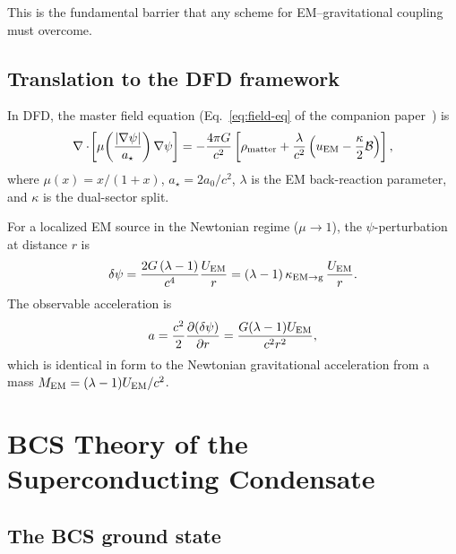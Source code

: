 \documentclass[12pt,aps,prd,twocolumn,superscriptaddress,nofootinbib]{revtex4-2}
\newcommand{\psifield}{\psi}
\newcommand{\astar}{a_\star}
\newcommand{\azero}{a_0}
\newcommand{\mufunction}{\mu}
\newcommand{\lam}{\lambda}
\newcommand{\kap}{\kappa}
\newcommand{\calB}{\mathcal{B}}
\begin{document}
This is the fundamental barrier that any scheme for EM--gravitational
coupling must overcome.

\subsection{Translation to the DFD framework}

In DFD, the master field equation (Eq.~\eqref{eq:field-eq} of the
companion paper~\cite{Alcock2025Deep_EM}) is
\begin{equation}\label{eq:dfd-master}
\nabla\cdot\!\left[\mufunction\!\left(\frac{|\nabla\psifield|}{\astar}\right)
\nabla\psifield\right] =
-\frac{4\pi G}{c^2}\left[
  \rho_{\rm matter}
  + \frac{\lam}{c^2}\left(u_{\rm EM} - \frac{\kap}{2}\calB\right)
\right],
\end{equation}
where $\mu(x) = x/(1+x)$, $\astar = 2\azero/c^2$, $\lam$ is the
EM back-reaction parameter, and $\kap$ is the dual-sector split.

For a localized EM source in the Newtonian regime ($\mu \to 1$),
the $\psi$-perturbation at distance $r$ is
\begin{equation}\label{eq:psi-classical}
\delta\psifield = \frac{2G\,(\lam-1)}{c^4}\frac{U_{\rm EM}}{r}
= (\lam-1)\,\kappa_{\rm EM\to g}\,\frac{U_{\rm EM}}{r}.
\end{equation}
The observable acceleration is
\begin{equation}\label{eq:accel-classical}
a = \frac{c^2}{2}\frac{\partial(\delta\psifield)}{\partial r}
= \frac{G(\lam-1)U_{\rm EM}}{c^2 r^2},
\end{equation}
which is identical in form to the Newtonian gravitational acceleration
from a mass $M_{\rm EM} = (\lam-1)U_{\rm EM}/c^2$.


\section{BCS Theory of the Superconducting Condensate}
\label{sec:bcs}

\subsection{The BCS ground state}
\end{document}
